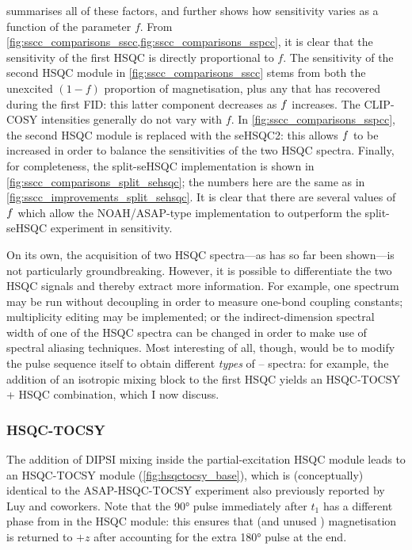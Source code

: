  summarises all of these factors, and further shows how sensitivity varies as a function of the parameter $f$.
From \cref{fig:sscc_comparisons_sscc,fig:sscc_comparisons_sspcc}, it is clear that the sensitivity of the first HSQC is directly proportional to $f$.
The sensitivity of the second HSQC module in \cref{fig:sscc_comparisons_sscc} stems from both the unexcited $(1 - f)$ proportion of  magnetisation, plus any that has recovered during the first FID: this latter component decreases as $f\/$ increases.
The CLIP-COSY intensities generally do not vary with $f$.
In \cref{fig:sscc_comparisons_sspcc}, the second HSQC module is replaced with the seHSQC2: this allows $f\/$ to be increased in order to balance the sensitivities of the two HSQC spectra.
Finally, for completeness, the split-seHSQC implementation is shown in \cref{fig:sscc_comparisons_split_sehsqc}; the numbers here are the same as in \cref{fig:sscc_improvements_split_sehsqc}.
It is clear that there are several values of $f\/$ which allow the NOAH/ASAP-type implementation to outperform the split-seHSQC experiment in sensitivity.

On its own, the acquisition of two HSQC spectra---as has so far been shown---is not particularly groundbreaking.
However, it is possible to differentiate the two HSQC signals and thereby extract more information.
For example, one spectrum may be run without decoupling in order to measure one-bond coupling constants\autocite{Enthart2008JMR,Nolis2019CPC}; multiplicity editing may be implemented\autocite{SchulzeSunninghausen2017JMR}; or the indirect-dimension spectral width of one of the HSQC spectra can be changed in order to make use of spectral aliasing techniques\autocite{Nolis2019JMR,Jeannerat2011eMR}.
Most interesting of all, though, would be to modify the pulse sequence itself to obtain different \textit{types} of \proton{}--\carbon{} spectra: for example, the addition of an isotropic mixing block to the first HSQC yields an HSQC-TOCSY + HSQC combination\autocite{Nolis2019CPC}, which I now discuss.


\subsubsection{HSQC-TOCSY}

The addition of DIPSI mixing inside the partial-excitation HSQC module leads to an HSQC-TOCSY module (\cref{fig:hsqctocsy_base}), which is (conceptually) identical to the ASAP-HSQC-TOCSY experiment also previously reported by Luy and coworkers\autocite{Becker2019JMR}.
Note that the \proton{} \ang{90} pulse immediately after $t_1$ has a different phase from in the HSQC module: this ensures that  (and unused ) magnetisation is returned to $+z$ after accounting for the extra \ang{180} pulse at the end.

